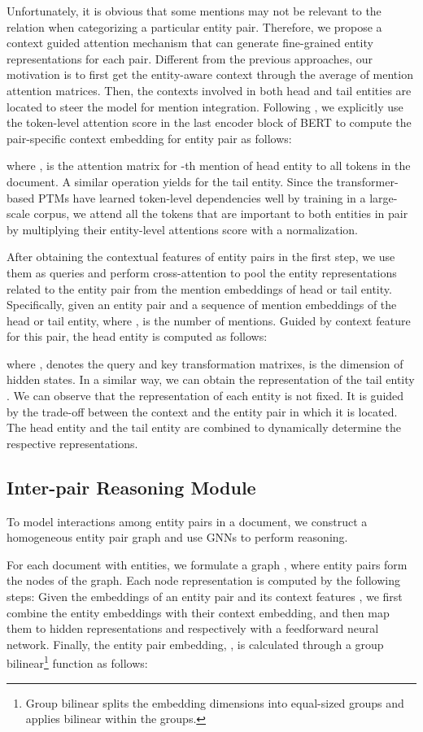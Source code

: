 \documentclass[11pt]{article}
\begin{document}
Unfortunately, it is obvious that some mentions may not be relevant to the relation when categorizing a particular entity pair.
Therefore, we propose a context guided attention mechanism that can generate fine-grained entity representations for each pair.
Different from the previous approaches, our motivation is to first get the entity-aware context through the average of mention attention matrices.
Then, the contexts involved in both head and tail entities are located to steer the model for mention integration.
Following \citet{DBLP:conf/aaai/Zhou0M021}, we explicitly use the token-level attention score  in the last encoder block of BERT to compute the pair-specific context embedding  for entity pair  as follows:


where ,  is the attention matrix for -th mention of head entity  to all tokens in the document.
A similar operation yields  for the tail entity. 
Since the transformer-based PTMs have learned token-level dependencies well by training in a large-scale corpus, we attend all the tokens that are important to both entities in pair  by multiplying their entity-level attentions score with a normalization.

After obtaining the contextual features of entity pairs in the first step, we use them as queries and perform cross-attention to pool the entity representations related to the entity pair from the mention embeddings of head or tail entity.
Specifically, given an entity pair  and a sequence of mention embeddings  of the head or tail entity, where ,  is the number of mentions.
Guided by context feature  for this pair, the head entity  is computed as follows:

where ,  denotes the query and key transformation matrixes,  is the dimension of hidden states.
In a similar way, we can obtain the representation of the tail entity .
We can observe that the representation of each entity is not fixed.
It is guided by the trade-off between the context and the entity pair in which it is located.
The head entity and the tail entity are combined to dynamically determine the respective representations.

\subsection{Inter-pair Reasoning Module}
To model interactions among entity pairs in a document, we construct a homogeneous entity pair graph and use GNNs to perform reasoning.

For each document  with  entities, we formulate a graph , where  entity pairs form the nodes of the graph.
Each node representation is computed by the following steps:
Given the embeddings  of an entity pair  and its context features , we first combine the entity embeddings with their context embedding, and then map them to hidden representations  and  respectively with a feedforward neural network.
Finally, the entity pair embedding, , is calculated through a group bilinear\footnote{Group bilinear \citep{DBLP:conf/nips/ZhengFZL19} splits the embedding dimensions into  equal-sized groups and applies bilinear within the groups.} function as follows:
\end{document}
